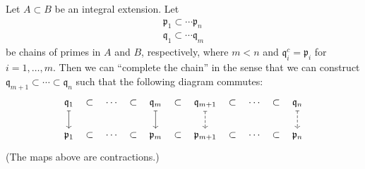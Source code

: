 \documentclass[12pt]{article}
\begin{document}
\begin{theorem}[going up]
	Let $A\subset B$ be an integral extension. Let 
	\begin{gather*}
		\mathfrak{p}_1\subset\cdots\mathfrak{p}_n \\
		\mathfrak{q}_1\subset\cdots\mathfrak{q}_m
	\end{gather*}
	be chains of primes in $A$ and $B$, respectively, where $m<n$ and $\mathfrak{q}_i^c=\mathfrak{p}_i$ for $i=1,\dots,m$. Then we can ``complete the chain'' in the sense that we can construct $\mathfrak{q}_{m+1}\subset\cdots\subset\mathfrak{q}_n$ such that the following diagram commutes:
	\begin{equation*}
\begin{tikzcd}
\mathfrak{q}_1 \arrow[r, "\subset", phantom] \arrow[d, maps to] & \cdots \arrow[r, "\subset", phantom] & \mathfrak{q}_m \arrow[r, "\subset", phantom] \arrow[d, maps to] & \mathfrak{q}_{m+1} \arrow[r, "\subset", phantom] \arrow[d, dashed, maps to] & \cdots \arrow[r, "\subset", phantom] & \mathfrak{q}_n \arrow[d, dashed, maps to] \\
\mathfrak{p}_1 \arrow[r, "\subset", phantom]                    & \cdots \arrow[r, "\subset", phantom] & \mathfrak{p}_m \arrow[r, "\subset", phantom]                    & \mathfrak{p}_{m+1} \arrow[r, "\subset", phantom]                            & \cdots \arrow[r, "\subset", phantom] & \mathfrak{p}_n                           
\end{tikzcd}
	\end{equation*}
	(The maps above are contractions.)
\end{theorem}
\end{document}
